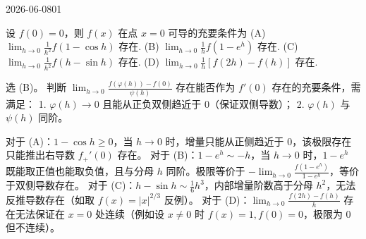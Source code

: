 \begin{mistake}{2026-06-08}{01}

\begin{problemcontent}
设 \(f(0)=0\)，则 \(f(x)\) 在点 \(x=0\) 可导的充要条件为
(A) \(\lim_{h \to 0} \frac{1}{h^2} f(1-\cos h)\) 存在.
(B) \(\lim_{h \to 0} \frac{1}{h} f(1-e^h)\) 存在.
(C) \(\lim_{h \to 0} \frac{1}{h^2} f(h-\sin h)\) 存在.
(D) \(\lim_{h \to 0} \frac{1}{h} [f(2h) - f(h)]\) 存在.
\end{problemcontent}

\begin{solutioncontent}
选 (B)。
判断 \(\lim_{h \to 0} \frac{f(\varphi(h)) - f(0)}{\psi(h)}\) 存在能否作为 \(f'(0)\) 存在的充要条件，需满足：
1. \(\varphi(h) \to 0\) 且能从正负双侧趋近于 0（保证双侧导数）；
2. \(\varphi(h)\) 与 \(\psi(h)\) 同阶。

对于 (A)：\(1-\cos h \ge 0\)，当 \(h \to 0\) 时，增量只能从正侧趋近于 0，该极限存在只能推出右导数 \(f_+'(0)\) 存在。
对于 (B)：\(1-e^h \sim -h\)，当 \(h \to 0\) 时，\(1-e^h\) 既能取正值也能取负值，且与分母 \(h\) 同阶。极限等价于 \(-\lim_{h \to 0} \frac{f(1-e^h)}{1-e^h}\)，等价于双侧导数存在。
对于 (C)：\(h-\sin h \sim \frac{1}{6}h^3\)，内部增量阶数高于分母 \(h^2\)，无法反推导数存在（如取 \(f(x)=|x|^{2/3}\) 反例）。
对于 (D)：\(\lim_{h \to 0} \frac{f(2h) - f(h)}{h}\) 存在无法保证在 \(x=0\) 处连续（例如设 \(x \neq 0\) 时 \(f(x)=1, f(0)=0\)，极限为 0 但不连续）。
\end{solutioncontent}


\end{mistake}
